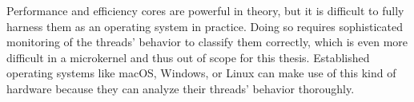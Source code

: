 Performance and efficiency cores are powerful in theory, but it is difficult to fully harness them as an operating system in practice.
Doing so requires sophisticated monitoring of the threads' behavior to classify them correctly, which is even more difficult in a microkernel and thus out of scope for this thesis.
Established operating systems like macOS, Windows, or Linux can make use of this kind of hardware because they can analyze their threads' behavior thoroughly.

\cleardoublepage

